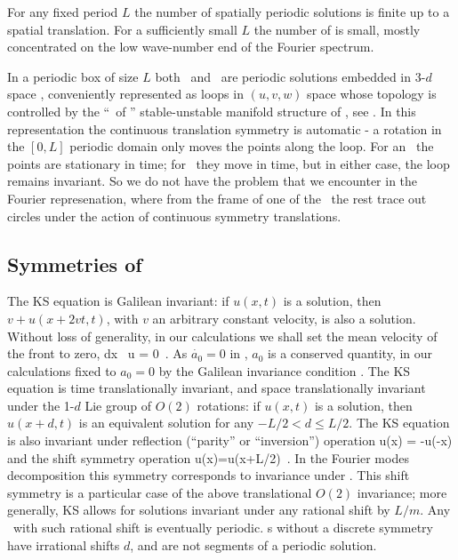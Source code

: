 For any fixed period $L$ the number 
of spatially periodic solutions is finite up to a spatial translation.
For a sufficiently small $L$ 
the number of {\eqva} is small,
mostly
concentrated on the low wave-number end of the Fourier spectrum.

In a periodic box of size $L$
both \eqva\ and \reqva\ are  periodic solutions 
embedded in 3-$d$ space , 
conveniently represented as loops in 
$(u,v,w)$ space whose topology is controlled by the
``\eqva\ of \eqva'' stable-unstable manifold structure of
, see .
In this representation the continuous translation symmetry
is automatic - a rotation in the $[0,L]$ periodic domain only
moves the points along the loop. For an \eqv\ the points
are stationary in time; for \reqv\ they move in time, but in
either case, the loop remains invariant.
So we do not have the problem that we encounter in the Fourier 
represenation, where from the frame of one of the \eqva\
the rest trace out circles under the action of continuous symmetry 
translations.



\subsection{Symmetries of \KSe}
\label{sec:KSeSymm}

The  KS equation is
Galilean invariant: if $u(x,t)$ is a solution, then 
$v+u(x+2vt,t)$, with $v$ an arbitrary constant velocity, is also a solution. 
Without loss of generality, in our calculations we shall set 
the mean velocity of the  front to zero,
\beq
\int dx \, u = 0
\,.
As  $\dot{a_0}=0$ in , 
$a_0$ is a conserved quantity, in our calculations
fixed to $a_0=0$ by the Galilean invariance condition .
The KS equation  \refeq{ks} is time translationally invariant,
and 
space translationally invariant
under the 1-$d$ Lie group of $O(2)$ rotations: if
$u(x,t)$ is a solution, then $u(x+d,t)$ is an equivalent
solution for any $-L/2 < d \leq L/2$.
The KS equation is also invariant under
reflection (``parity'' or ``inversion'') operation
\beq
\Refl u(x) = -u(-x)
and the shift symmetry operation 
\beq
\Shift u(x)=u(x+L/2)
\,. 
In the Fourier modes decomposition  this
symmetry corresponds to invariance under
.
This shift symmetry is a particular case of the
above translational $O(2)$ invariance; more generally,
KS allows for solutions invariant under any rational shift by
$L/m$. Any \rpo\ with such rational shift is eventually periodic.
\Rpo s without a discrete symmetry have irrational shifts
$d$, and are not segments of a periodic solution.


